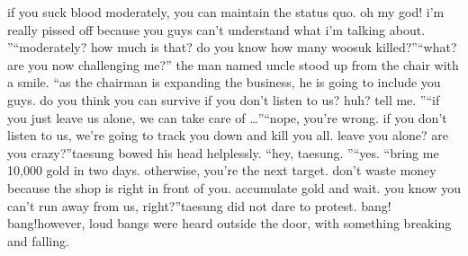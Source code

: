  if you suck blood moderately, you can maintain the status quo.
 oh my god! i’m really pissed off because you guys can’t understand what i’m talking about.
”“moderately? how much is that? do you know how many woosuk killed?”“what? are you now challenging me?” the man named uncle stood up from the chair with a smile.
“as the chairman is expanding the business, he is going to include you guys.
 do you think you can survive if you don’t listen to us? huh? tell me.
”“if you just leave us alone, we can take care of …”“nope, you’re wrong.
 if you don’t listen to us, we’re going to track you down and kill you all.
 leave you alone? are you crazy?”taesung bowed his head helplessly.
“hey, taesung.
”“yes.
“bring me 10,000 gold in two days.
 otherwise, you’re the next target.
 don’t waste money because the shop is right in front of you.
 accumulate gold and wait.
 you know you can’t run away from us, right?”taesung did not dare to protest.
bang! bang!however, loud bangs were heard outside the door, with something breaking and falling.


